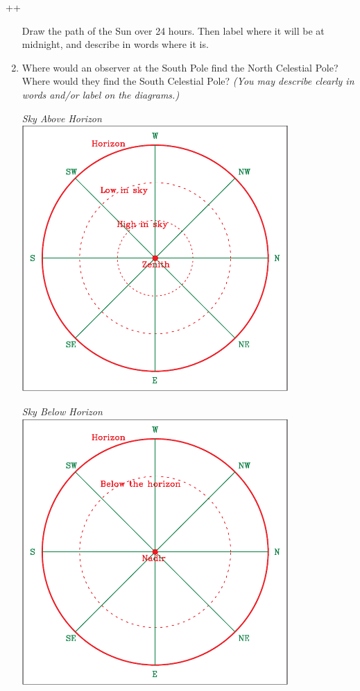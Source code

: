 ++\documentclass[12pt]{article}
\begin{document}
\begin{enumerate}
		Draw the path of the Sun over 24 hours. Then label where it will be at midnight, and describe in words where it is. 
		
		\newpage
		
		\item Where would an observer at the South Pole find the North Celestial Pole? Where would they find the South Celestial Pole? {\it (You may describe clearly in words and/or label on the diagrams.)}
		
				\begin{center}
			\begin{minipage}{0.4\textwidth}
				\begin{center}
					\it Sky Above Horizon\\
					\includegraphics[width=0.8\textwidth]{topsky-crop.pdf}
				\end{center}
			\end{minipage}
			\begin{minipage}{0.4\textwidth}
				\begin{center}
					\it Sky Below Horizon\\
					\includegraphics[width=0.8\textwidth]{botsky-crop.pdf}

\end{center}
\end{minipage}
\end{center}
\end{enumerate}
\end{document}
